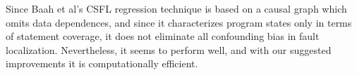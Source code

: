Since Baah et al’s CSFL regression technique is based on a causal graph which omits data dependences, and since it characterizes program states only in terms of statement coverage, it does not eliminate all confounding bias in fault localization.  Nevertheless, it seems to perform well, and with our suggested improvements it is computationally efficient.










